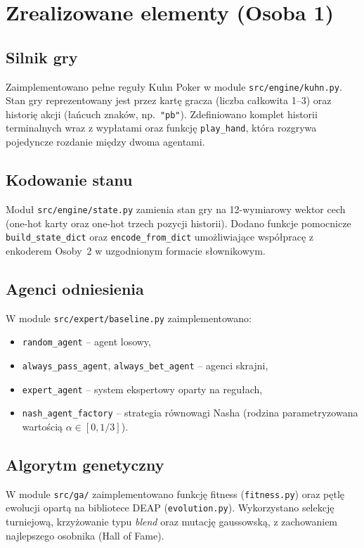 \documentclass[12pt,a4paper]{article}
\begin{document}
\section{Zrealizowane elementy (Osoba 1)}

\subsection{Silnik gry}
Zaimplementowano pełne reguły Kuhn Poker w module \texttt{src/engine/kuhn.py}.
Stan gry reprezentowany jest przez kartę gracza (liczba całkowita
1--3) oraz historię akcji (łańcuch znaków, np.\ \texttt{"pb"}).
Zdefiniowano komplet historii terminalnych wraz z wypłatami oraz
funkcję \texttt{play\_hand}, która rozgrywa pojedyncze rozdanie między
dwoma agentami.

\subsection{Kodowanie stanu}
Moduł \texttt{src/engine/state.py} zamienia stan gry na 12-wymiarowy
wektor cech (one-hot karty oraz one-hot trzech pozycji historii).
Dodano funkcje pomocnicze \texttt{build\_state\_dict} oraz
\texttt{encode\_from\_dict} umożliwiające współpracę z enkoderem
Osoby~2 w uzgodnionym formacie słownikowym.

\subsection{Agenci odniesienia}
W module \texttt{src/expert/baseline.py} zaimplementowano:
\begin{itemize}[nosep]
    \item \texttt{random\_agent} -- agent losowy,
    \item \texttt{always\_pass\_agent}, \texttt{always\_bet\_agent} -- agenci skrajni,
    \item \texttt{expert\_agent} -- system ekspertowy oparty na regułach,
    \item \texttt{nash\_agent\_factory} -- strategia równowagi Nasha
          (rodzina parametryzowana wartością $\alpha \in [0, 1/3]$).
\end{itemize}

\subsection{Algorytm genetyczny}
W module \texttt{src/ga/} zaimplementowano funkcję fitness
(\texttt{fitness.py}) oraz pętlę ewolucji opartą na bibliotece DEAP
(\texttt{evolution.py}). Wykorzystano selekcję turniejową, krzyżowanie
typu \emph{blend} oraz mutację gaussowską, z zachowaniem najlepszego
osobnika (Hall of Fame).
\end{document}
